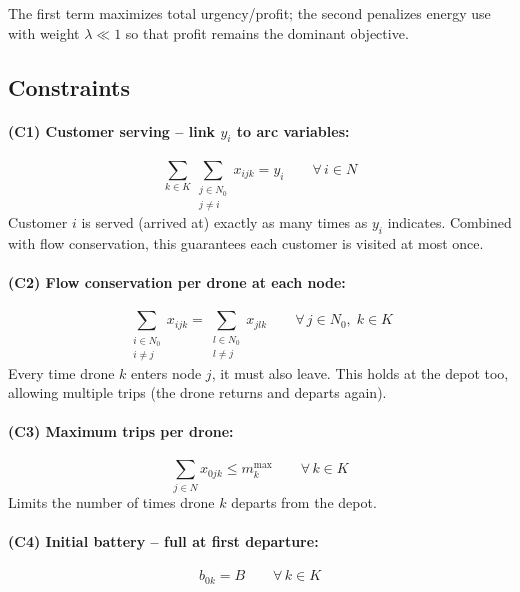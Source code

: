 \documentclass[12pt,a4paper]{article}
\begin{document}
The first term maximizes total urgency/profit; the second penalizes energy use with
weight $\lambda \ll 1$ so that profit remains the dominant objective.

\subsection{Constraints}

\paragraph{(C1) Customer serving -- link $y_i$ to arc variables:}
\begin{equation}
  \sum_{k \in K} \sum_{\substack{j \in N_0 \\ j \neq i}} x_{ijk} = y_i
  \qquad \forall\, i \in N
  \tag{C1}
\end{equation}
Customer $i$ is served (arrived at) exactly as many times as $y_i$ indicates. Combined
with flow conservation, this guarantees each customer is visited at most once.

\paragraph{(C2) Flow conservation per drone at each node:}
\begin{equation}
  \sum_{\substack{i \in N_0 \\ i \neq j}} x_{ijk} =
  \sum_{\substack{l \in N_0 \\ l \neq j}} x_{jlk}
  \qquad \forall\, j \in N_0,\; k \in K
  \tag{C2}
\end{equation}
Every time drone $k$ enters node $j$, it must also leave. This holds at the depot too,
allowing multiple trips (the drone returns and departs again).

\paragraph{(C3) Maximum trips per drone:}
\begin{equation}
  \sum_{j \in N} x_{0jk} \leq m^{\max}_k
  \qquad \forall\, k \in K
  \tag{C3}
\end{equation}
Limits the number of times drone $k$ departs from the depot.

\paragraph{(C4) Initial battery -- full at first departure:}
\begin{equation}
  b_{0k} = B
  \qquad \forall\, k \in K
  \tag{C4}
\end{equation}
\end{document}
